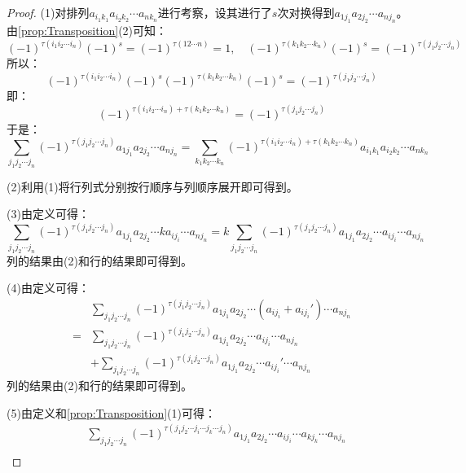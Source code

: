 \begin{proof}
	(1)对排列$a_{i_1k_1}a_{i_2k_2}\cdots a_{nk_n}$进行考察，设其进行了$s$次对换得到$a_{1j_1}a_{2j_2}\cdots a_{nj_n}$。由\cref{prop:Transposition}(2)可知：
	\begin{equation*}
		(-1)^{\tau(i_1i_2\cdots i_n)}(-1)^{s}=(-1)^{\tau(12\cdots n)}=1,\quad
		(-1)^{\tau(k_1k_2\cdots k_n)}(-1)^{s}=(-1)^{\tau(j_1j_2\cdots j_n)}
	\end{equation*}
	所以：
	\begin{equation*}
		(-1)^{\tau(i_1i_2\cdots i_n)}(-1)^{s}(-1)^{\tau(k_1k_2\cdots k_n)}(-1)^{s}=(-1)^{\tau(j_1j_2\cdots j_n)}
	\end{equation*}
	即：
	\begin{equation*}
		(-1)^{\tau(i_1i_2\cdots i_n)+\tau(k_1k_2\cdots k_n)}=(-1)^{\tau(j_1j_2\cdots j_n)}
	\end{equation*}
	于是：
	\begin{equation*}
		\sum_{j_1j_2\cdots j_n}^{}(-1)^{\tau(j_1j_2\cdots j_n)}a_{1j_1}a_{2j_2}\cdots a_{nj_n}=\sum_{k_1k_2\cdots k_n}^{}(-1)^{\tau(i_1i_2\cdots i_n)+\tau(k_1k_2\cdots k_n)}a_{i_1k_1}a_{i_2k_2}\cdots a_{nk_n}
	\end{equation*}\par
	(2)利用(1)将行列式分别按行顺序与列顺序展开即可得到。\par
	(3)由定义可得：
	\begin{equation*}
		\sum_{j_1j_2\cdots j_n}^{}(-1)^{\tau(j_1j_2\cdots j_n)}a_{1j_1}a_{2j_2}\cdots ka_{ij_i}\cdots a_{nj_n}=k\sum_{j_1j_2\cdots j_n}^{}(-1)^{\tau(j_1j_2\cdots j_n)}a_{1j_1}a_{2j_2}\cdots a_{ij_i}\cdots a_{nj_n}
	\end{equation*}
	列的结果由(2)和行的结果即可得到。\par
	(4)由定义可得：
	\begin{align*}
		&\sum_{j_1j_2\cdots j_n}^{}(-1)^{\tau(j_1j_2\cdots j_n)}a_{1j_1}a_{2j_2}\cdots (a_{ij_i}+a_{ij_i}')\cdots a_{nj_n} \\
		=&\sum_{j_1j_2\cdots j_n}^{}(-1)^{\tau(j_1j_2\cdots j_n)}a_{1j_1}a_{2j_2}\cdots a_{ij_i}\cdots a_{nj_n} \\
		&+\sum_{j_1j_2\cdots j_n}^{}(-1)^{\tau(j_1j_2\cdots j_n)}a_{1j_1}a_{2j_2}\cdots a_{ij_i}'\cdots a_{nj_n}
	\end{align*}
	列的结果由(2)和行的结果即可得到。\par
	(5)由定义和\cref{prop:Transposition}(1)可得：
	\begin{align*}
		&\sum_{j_1j_2\cdots j_n}^{}(-1)^{\tau(j_1j_2\cdots j_i\cdots j_k\cdots j_n)}a_{1j_1}a_{2j_2}\cdots a_{ij_i}\cdots a_{kj_k}\cdots a_{nj_n} \\

\end{align*}
\end{proof}
